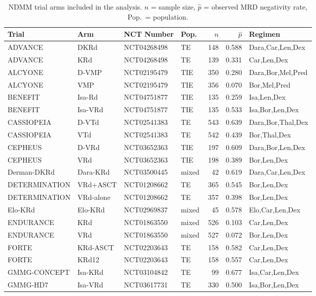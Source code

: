 \documentclass[12pt]{article}
\begin{document}
\begin{table}[ht]
\centering
\caption{NDMM trial arms included in the analysis. $n$ = sample size, $\hat{p}$ = observed MRD negativity rate, Pop.\ = population.}
\label{tab:trial_arms}
\small
\begin{tabular}{llllrrl}
\toprule
Trial & Arm & NCT Number & Pop.\ & $n$ & $\hat{p}$ & Regimen \\
\midrule
ADVANCE & DKRd & NCT04268498 & TE & 148 & 0.588 & Dara,Car,Len,Dex \\
ADVANCE & KRd & NCT04268498 & TE & 139 & 0.331 & Car,Len,Dex \\
ALCYONE & D-VMP & NCT02195479 & TIE & 350 & 0.280 & Dara,Bor,Mel,Pred \\
ALCYONE & VMP & NCT02195479 & TIE & 356 & 0.070 & Bor,Mel,Pred \\
BENEFIT & Isa-Rd & NCT04751877 & TIE & 135 & 0.259 & Isa,Len,Dex \\
BENEFIT & Isa-VRd & NCT04751877 & TIE & 135 & 0.533 & Isa,Bor,Len,Dex \\
CASSIOPEIA & D-VTd & NCT02541383 & TE & 543 & 0.639 & Dara,Bor,Thal,Dex \\
CASSIOPEIA & VTd & NCT02541383 & TE & 542 & 0.439 & Bor,Thal,Dex \\
CEPHEUS & D-VRd & NCT03652363 & TIE & 197 & 0.609 & Dara,Bor,Len,Dex \\
CEPHEUS & VRd & NCT03652363 & TIE & 198 & 0.389 & Bor,Len,Dex \\
Derman-DKRd & Dara-KRd & NCT03500445 & mixed & 42 & 0.619 & Dara,Car,Len,Dex \\
DETERMINATION & VRd+ASCT & NCT01208662 & TE & 365 & 0.545 & Bor,Len,Dex \\
DETERMINATION & VRd-alone & NCT01208662 & TE & 357 & 0.398 & Bor,Len,Dex \\
Elo-KRd & Elo-KRd & NCT02969837 & mixed & 45 & 0.578 & Elo,Car,Len,Dex \\
ENDURANCE & KRd & NCT01863550 & mixed & 526 & 0.103 & Car,Len,Dex \\
ENDURANCE & VRd & NCT01863550 & mixed & 527 & 0.072 & Bor,Len,Dex \\
FORTE & KRd-ASCT & NCT02203643 & TE & 158 & 0.582 & Car,Len,Dex \\
FORTE & KRd12 & NCT02203643 & TE & 158 & 0.557 & Car,Len,Dex \\
GMMG-CONCEPT & Isa-KRd & NCT03104842 & TE & 99 & 0.677 & Isa,Car,Len,Dex \\
GMMG-HD7 & Isa-VRd & NCT03617731 & TE & 330 & 0.500 & Isa,Bor,Len,Dex \\

\end{tabular}
\end{table}
\end{document}
